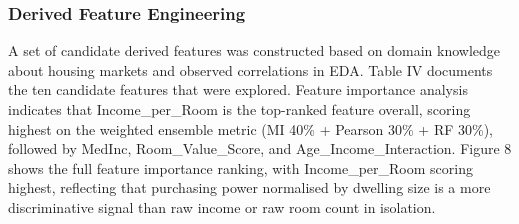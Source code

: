 \documentclass[pdflatex,sn-mathphys-num]{sn-jnl}
\begin{document}
\subsubsection{Derived Feature Engineering}
A set of candidate derived features was constructed based on domain knowledge about housing markets and observed correlations in EDA. Table IV documents the ten candidate features that were explored. Feature importance analysis indicates that Income\_per\_Room is the top-ranked feature overall, scoring highest on the weighted ensemble metric (MI 40\% + Pearson 30\% + RF 30\%), followed by MedInc, Room\_Value\_Score, and Age\_Income\_Interaction. Figure 8 shows the full feature importance ranking, with Income\_per\_Room scoring highest, reflecting that purchasing power normalised by dwelling size is a more discriminative signal than raw income or raw room count in isolation.
\end{document}
